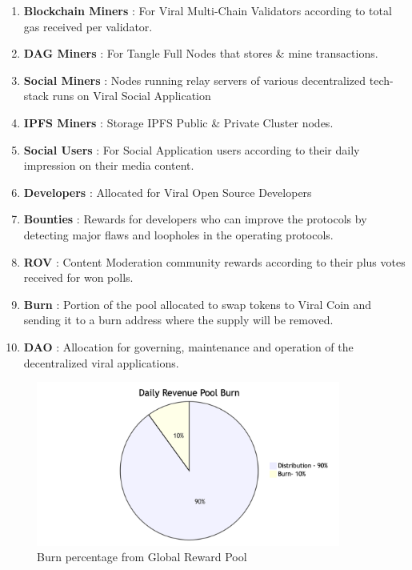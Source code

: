 \documentclass[10pt]{article}
\begin{document}
\begin{enumerate}[leftmargin=+0.2in]
\item \textbf{Blockchain Miners} : For Viral Multi-Chain Validators according to total gas received per validator.
\item \textbf{DAG Miners} : For Tangle Full Nodes that stores \& mine transactions.
\item \textbf{Social Miners} : Nodes running relay servers of various decentralized tech-stack runs on Viral Social Application
\item \textbf{IPFS Miners} : Storage IPFS Public \& Private Cluster nodes.
\item \textbf{Social Users} : For Social Application users according to their daily impression on their media content.
\item \textbf{Developers} : Allocated for Viral Open Source Developers
\item \textbf{Bounties} : Rewards for developers who can improve the protocols by detecting major flaws and loopholes in the operating protocols.
\item \textbf{ROV} : Content Moderation community rewards according to their plus votes received for won polls.
\item \textbf{Burn} : Portion of the pool allocated to swap tokens to Viral Coin and sending it to a burn address where the supply will be removed.
\item \textbf{DAO} : Allocation for governing, maintenance and operation of the decentralized viral applications.

\end{enumerate} 

\begin{figure}[H]
\begin{center}
\includegraphics[width=10cm]{burn-chart}
\caption{Burn percentage from Global Reward Pool}
\end{center}
\end{figure}
\end{document}
